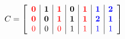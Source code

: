\documentclass{article}
\begin{document}
 $
C = \left[
\begin{array}{c|c|c|c|c|c|c}
\textbf{\color{red}0} & \textbf{1} & \textbf{\color{red}1} & \textbf{0} & \textbf{\color{red}1} & \textbf{\color{blue}1} & \textbf{\color{blue}2} \\
\textbf{\color{red}0} & \textbf{0} & \textbf{\color{red}1} & \textbf{1} & \textbf{\color{red}1} & \textbf{\color{blue}2} & \textbf{\color{blue}1} \\
{\color{red}0} & 0 & {\color{red}0} & 1 & {\color{red}1} & {\color{blue}1} & {\color{blue}1} \\
\end{array}
\right] $
\end{document}
